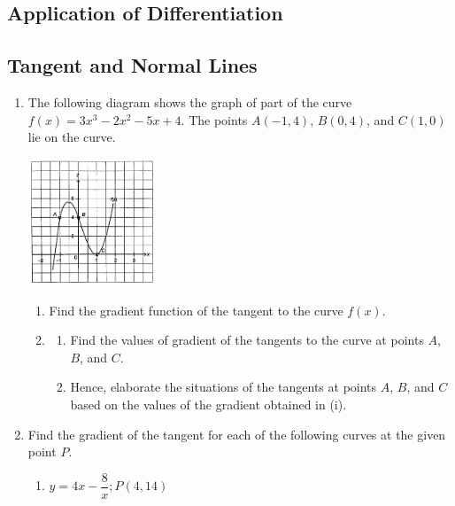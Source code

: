 \documentclass{report}
\begin{document}
\begin{multicols}{2}
      \section{Application of Differentiation}
      \subsection{Tangent and Normal Lines}
      \begin{enumerate}
            \item The following diagram shows the graph of part of the curve $f(x) = 3x^3 -2x^2 -
                        5x + 4$. The points $A(-1, 4)$, $B(0, 4)$, and $C(1, 0)$ lie on the curve.
                  \begin{center}
                        \includegraphics[width=0.3\textwidth]{./images/q24.jpeg}
                  \end{center}
                  \begin{enumerate}
                        \item Find the gradient function of the tangent to the curve $f(x)$.
                        \item \begin{enumerate}
                                    \item Find the values of gradient of the tangents to the curve at points $A$, $B$,
                                          and $C$.
                                    \item Hence, elaborate the situations of the tangents at points $A$, $B$, and $C$
                                          based on the values of the gradient obtained in (i).
                              \end{enumerate}
                  \end{enumerate}
            \item Find the gradient of the tangent for each of the following curves at the given
                  point $P$.
                  \begin{enumerate}
                        \item $y = 4x - \dfrac{8}{x}; P(4, 14)$

\end{enumerate}
\end{enumerate}
\end{multicols}
\end{document}
